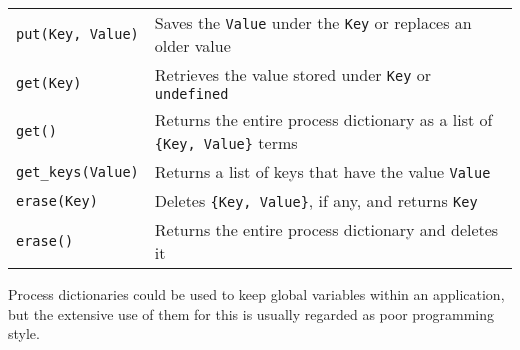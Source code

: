 \begin{center}
\begin{tabular}{|>{\raggedright}p{79pt}|>{\raggedright}p{247pt}|}
\hline
\multicolumn{2}{|p{326pt}|}{Process dictionary BIFs}\tabularnewline
\hline
\texttt{put(Key, Value)} & Saves the \texttt{Value} under the \texttt{Key} or replaces an older value\tabularnewline
\hline
\texttt{get(Key)} & Retrieves the value stored under \texttt{Key} or \texttt{undefined}\tabularnewline
\hline
\texttt{get()} & Returns the entire process dictionary as a list of \texttt{\{Key, Value\}} terms\tabularnewline
\hline
\texttt{get\_keys(Value)} & Returns a list of keys that have the value \texttt{Value}\tabularnewline
\hline
\texttt{erase(Key)} & Deletes \texttt{\{Key, Value\}}, if any, and returns \texttt{Key}\tabularnewline
\hline
\texttt{erase()} & Returns the entire process dictionary and deletes it\tabularnewline
\hline
\end{tabular}
\end{center}

Process dictionaries could be used to keep global variables within an application,
but the extensive use of them for this is usually regarded as poor programming style.

